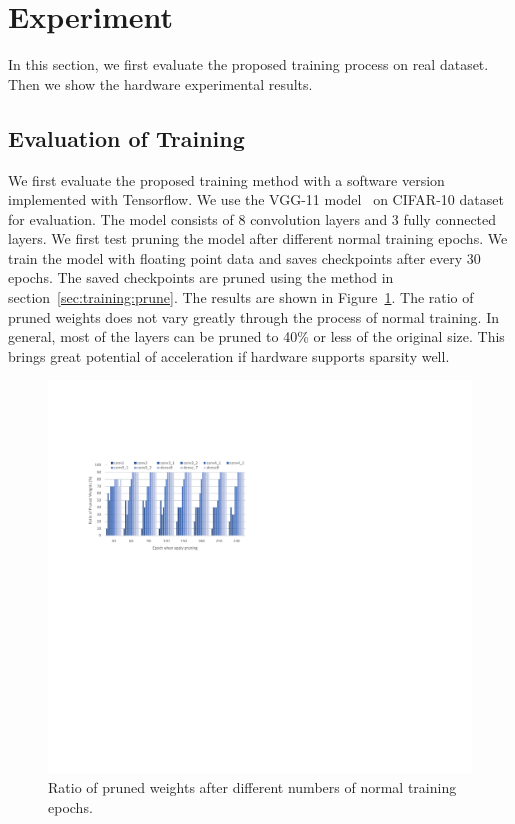 \section{Experiment}\label{sec:experiment}
In this section, we first evaluate the proposed training process on real dataset. Then we show the hardware experimental results. 

\subsection{Evaluation of Training}
We first evaluate the proposed training method with a software version implemented with Tensorflow. We use the VGG-11 model~\cite{simonyan2014very} on CIFAR-10 dataset for evaluation. The model consists of 8 convolution layers and 3 fully connected layers. We first test pruning the model after different normal training epochs. We train the model with floating point data and saves checkpoints after every 30 epochs. The saved checkpoints are pruned using the method in section~\ref{sec:training:prune}. The results are shown in Figure~\ref{fig:prune_exp}. The ratio of pruned weights does not vary greatly through the process of normal training. In general, most of the layers can be pruned to 40\% or less of the original size. This brings great potential of acceleration if hardware supports sparsity well.

\begin{figure}[tb]
  \centering
  \includegraphics[width=1.0\columnwidth]{figures/pruning_exp.pdf}
  \caption{Ratio of pruned weights after different numbers of normal training epochs. }
  \label{fig:prune_exp}
\end{figure}

